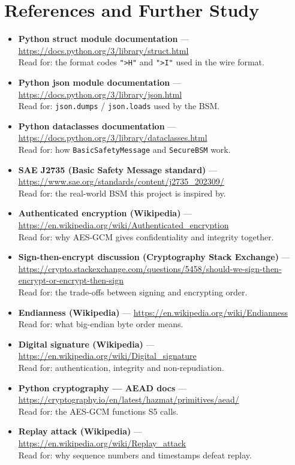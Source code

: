 \documentclass[11pt,a4paper]{report}
\begin{document}
\section{References and Further Study}
\begin{itemize}
  \item \textbf{Python struct module documentation} ---
        \url{https://docs.python.org/3/library/struct.html}\\
        Read for: the format codes \texttt{">H"} and \texttt{">I"} used in the
        wire format.
  \item \textbf{Python json module documentation} ---
        \url{https://docs.python.org/3/library/json.html}\\
        Read for: \texttt{json.dumps} / \texttt{json.loads} used by the BSM.
  \item \textbf{Python dataclasses documentation} ---
        \url{https://docs.python.org/3/library/dataclasses.html}\\
        Read for: how \texttt{BasicSafetyMessage} and \texttt{SecureBSM} work.
  \item \textbf{SAE J2735 (Basic Safety Message standard)} ---
        \url{https://www.sae.org/standards/content/j2735_202309/}\\
        Read for: the real-world BSM this project is inspired by.
  \item \textbf{Authenticated encryption (Wikipedia)} ---
        \url{https://en.wikipedia.org/wiki/Authenticated_encryption}\\
        Read for: why AES-GCM gives confidentiality and integrity together.
  \item \textbf{Sign-then-encrypt discussion (Cryptography Stack Exchange)} ---
        \url{https://crypto.stackexchange.com/questions/5458/should-we-sign-then-encrypt-or-encrypt-then-sign}\\
        Read for: the trade-offs between signing and encrypting order.
  \item \textbf{Endianness (Wikipedia)} ---
        \url{https://en.wikipedia.org/wiki/Endianness}\\
        Read for: what big-endian byte order means.
  \item \textbf{Digital signature (Wikipedia)} ---
        \url{https://en.wikipedia.org/wiki/Digital_signature}\\
        Read for: authentication, integrity and non-repudiation.
  \item \textbf{Python cryptography --- AEAD docs} ---
        \url{https://cryptography.io/en/latest/hazmat/primitives/aead/}\\
        Read for: the AES-GCM functions S5 calls.
  \item \textbf{Replay attack (Wikipedia)} ---
        \url{https://en.wikipedia.org/wiki/Replay_attack}\\
        Read for: why sequence numbers and timestamps defeat replay.
\end{itemize}
\end{document}
